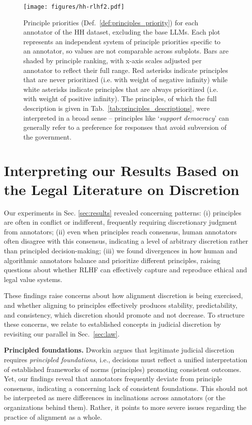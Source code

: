 \documentclass{article}
\begin{document}
\begin{landscape}
\begin{figure}[p]
    \centering
\texttt{[image: figures/hh-rlhf2.pdf]}
    \caption{Principle priorities (Def.~\ref{def:principles_priority}) for each annotator of the HH dataset, excluding the base LLMs. Each plot represents an independent system of principle priorities specific to an annotator, so values are not comparable across subplots. Bars are shaded by principle ranking, with x-axis scales adjusted per annotator to reflect their full range. Red asterisks indicate principles that are never prioritized (i.e. with weight of negative infinity) while white asterisks indicate principles that are always prioritized (i.e. with weight of positive infinity). The principles, of which the full description is given in  Tab.~\ref{tab:principles_descriptions}, were interpreted in a broad sense -- principles like `\textit{support democracy}' can generally refer to a preference for responses that avoid subversion of the government.
    }
    \label{fig:priority-hh}
    \end{figure}
\end{landscape}


\clearpage
\section{Interpreting our Results Based on the Legal Literature on Discretion}\label{sec:legal_concepts}
Our experiments in Sec. \ref{sec:results} revealed concerning patterns: (i) 
principles are often in conflict or indifferent,
frequently requiring discretionary judgment from annotators; (ii) even when principles reach consensus, human annotators often disagree with this consensus, indicating a level of arbitrary discretion rather than principled decision-making; (iii) 
we found divergences in how human and algorithmic annotators balance and prioritize different principles, raising questions about whether RLHF can effectively capture and reproduce ethical and legal value systems. 

These findings raise concerns about how alignment discretion is being exercised, and whether aligning to  principles effectively produces stability, predictability, and consistency, which discretion should promote and not decrease. To structure these concerns, we relate to established concepts in judicial discretion by revisiting our parallel in Sec.~\ref{sec:law}.


\noindent\textbf{Principled foundations.}
Dworkin \cite{dworkin1986law} argues that legitimate judicial discretion requires \textit{principled foundations}, i.e., decisions must reflect a unified interpretation of established frameworks of norms (principles) promoting consistent outcomes.
Yet, our findings reveal that annotators frequently deviate from principle consensus, indicating a concerning lack of consistent foundations. This should not be interpreted as mere differences in inclinations across annotators (or the organizations behind them). Rather, it points to more severe issues regarding the practice of alignment as a whole.
\end{document}
